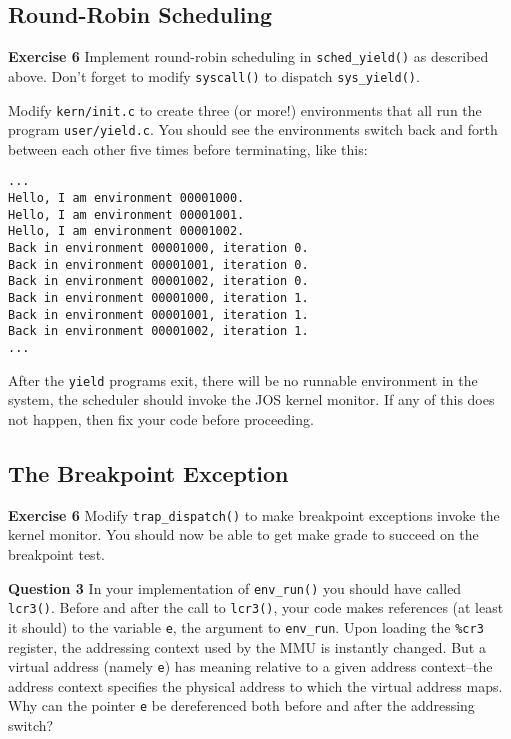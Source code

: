 \documentclass[11pt]{article}
\begin{document}
\subsection{Round-Robin Scheduling}
\begin{framed}
\noindent\textbf{Exercise 6} Implement round-robin scheduling in \lstinline|sched_yield()| as described above. Don't forget to modify \lstinline|syscall()| to dispatch \lstinline|sys_yield()|.

Modify \lstinline|kern/init.c| to create three (or more!) environments that all run the program \lstinline|user/yield.c|. You should see the environments switch back and forth between each other five times before terminating, like this:

\begin{lstlisting}[aboveskip=-1.5em,frame=none]
...
Hello, I am environment 00001000.
Hello, I am environment 00001001.
Hello, I am environment 00001002.
Back in environment 00001000, iteration 0.
Back in environment 00001001, iteration 0.
Back in environment 00001002, iteration 0.
Back in environment 00001000, iteration 1.
Back in environment 00001001, iteration 1.
Back in environment 00001002, iteration 1.
...
\end{lstlisting}

After the \lstinline|yield| programs exit, there will be no runnable environment in the system, the scheduler should invoke the JOS kernel monitor. If any of this does not happen, then fix your code before proceeding.
\end{framed}

\subsection{The Breakpoint Exception}
\begin{framed}
\noindent\textbf{Exercise 6} Modify \lstinline|trap_dispatch()| to make breakpoint exceptions invoke the kernel monitor. You should now be able to get make grade to succeed on the breakpoint test. 
\end{framed}

\begin{framed}
\noindent\textbf{Question 3} In your implementation of \lstinline|env_run()| you should have called \lstinline|lcr3()|. Before and after the call to \lstinline|lcr3()|, your code makes references (at least it should) to the variable \lstinline|e|, the argument to \lstinline|env_run|. Upon loading the \lstinline|%cr3| register, the addressing context used by the MMU is instantly changed. But a virtual address (namely \lstinline|e|) has meaning relative to a given address context--the address context specifies the physical address to which the virtual address maps. Why can the pointer \lstinline|e| be dereferenced both before and after the addressing switch?
\end{framed}
\end{document}
